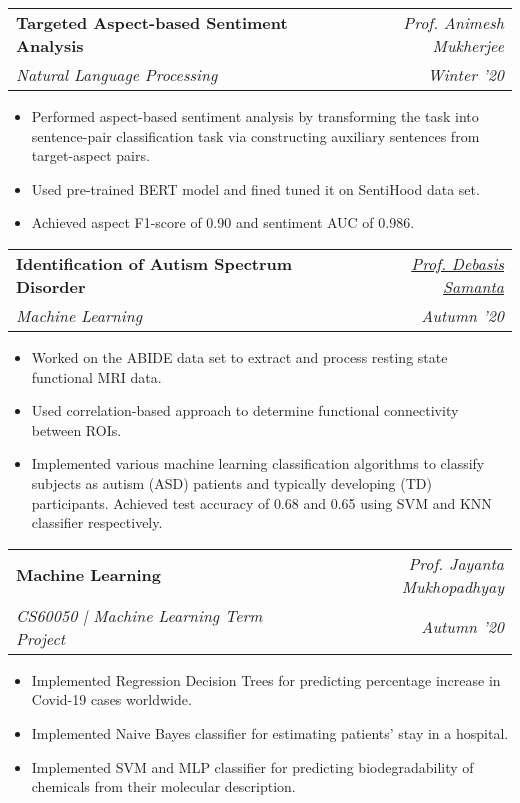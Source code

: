 \documentclass[letterpaper,10pt]{article}
\makeatletter
\newcommand{\resumeSubheading}[4]{
  \vspace{-1pt}\item
    \begin{tabular*}{0.97\textwidth}{l@{\extracolsep{\fill}}r}
      \textbf{#1} & #2 \\
      \textit{\small#3} & \textit{\small #4} \\
    \end{tabular*}\vspace{-5pt}
}
\makeatother
\begin{document}
    \resumeSubheading
      {Targeted Aspect-based Sentiment Analysis \href{https://github.com/utkarsh512/Autism}{\faGithub}}{\textit{Prof. Animesh Mukherjee}}
      {Natural Language Processing}{Winter '20}
      \begin{itemize}
          \itemsep-0.15em
          \item {Performed aspect-based sentiment analysis by transforming the task into sentence-pair classification task via constructing auxiliary sentences from target-aspect pairs.}
          \item {Used pre-trained BERT model and fined tuned it on SentiHood data set.}
          \item {Achieved aspect F1-score of 0.90 and sentiment AUC of 0.986.}
      \end{itemize}
    
    \resumeSubheading
      {Identification of Autism Spectrum Disorder \href{https://github.com/utkarsh512/Autism}{\faGithub}}{\textit{\href{https://cse.iitkgp.ac.in/~dsamanta/}{Prof. Debasis Samanta}}}
      {Machine Learning}{Autumn '20}
      \begin{itemize}
          \itemsep-0.15em
          \item {Worked on the ABIDE data set to extract and process resting state functional MRI data.}
          \item {Used correlation-based approach to determine functional connectivity between ROIs.}
          \item {Implemented various machine learning classification algorithms to classify subjects as autism (ASD) patients and typically developing (TD) participants. Achieved test accuracy of 0.68 and 0.65 using SVM and KNN classifier respectively.}
      \end{itemize}

    \resumeSubheading
      {Machine Learning \href{https://github.com/utkarsh512/CS60050-Machine-Learning}{\faGithub}}{\textit{Prof. Jayanta Mukhopadhyay}}
      {CS60050 | Machine Learning Term Project}{Autumn '20}
      \begin{itemize}
          \itemsep-0.15em
          \item {Implemented Regression Decision Trees for predicting percentage increase in Covid-19 cases worldwide.}
          \item {Implemented Naive Bayes classifier for estimating patients' stay in a hospital.}
          \item {Implemented SVM and MLP classifier for predicting biodegradability of chemicals from their molecular description.}
      \end{itemize}
\end{document}
